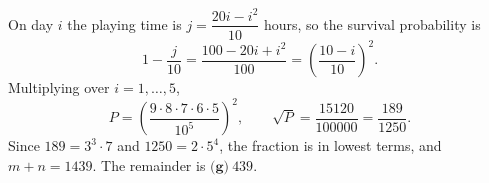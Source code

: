 On day $i$ the playing time is $j=\dfrac{20i-i^2}{10}$ hours, so the survival probability is
\[
1-\dfrac{j}{10}=\dfrac{100-20i+i^2}{100}=\left(\dfrac{10-i}{10}\right)^2 .
\]
Multiplying over $i=1,\dots,5$,
\[
P=\left(\dfrac{9\cdot8\cdot7\cdot6\cdot5}{10^5}\right)^2,\qquad \sqrt P=\dfrac{15120}{100000}=\dfrac{189}{1250}.
\]
Since $189=3^3\cdot7$ and $1250=2\cdot5^4$, the fraction is in lowest terms, and $m+n=1439$. The remainder is $\boxed{\textbf{(g)}\ 439}$.
